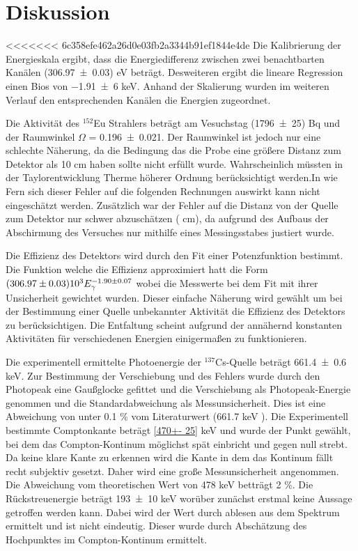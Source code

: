 \section{Diskussion}
\label{sec:Diskussion}
<<<<<<< 6c358efe462a26d0e03fb2a3344b91ef1844e4de
Die Kalibrierung der Energieskala ergibt, dass die Energiedifferenz zwischen zwei benachtbarten Kanälen (\num{306.97 +- 0.03}) eV beträgt. Desweiteren ergibt die lineare Regression einen Bios von \num{-1.91 +- 6} keV. Anhand der Skalierung wurden im weiteren Verlauf den entsprechenden Kanälen die Energien zugeordnet. 

Die Aktivität des $^{152}$Eu Strahlers beträgt am Vesuchstag (\num{1796 +- 25}) Bq und der Raumwinkel $\Omega$ = \num{0.196 +- 0.021}. Der Raumwinkel ist jedoch nur eine schlechte Näherung, da die Bedingung das die Probe eine größere Distanz zum Detektor als 10 cm haben sollte nicht erfüllt wurde. Wahrscheinlich müssten in der Taylorentwicklung Therme höherer Ordnung berücksichtigt werden.In wie Fern sich dieser Fehler auf die folgenden Rechnungen auswirkt kann nicht eingeschätzt werden. Zusätzlich war der Fehler auf die Distanz von der Quelle zum Detektor nur schwer abzuschätzen ( cm), da aufgrund des Aufbaus der Abschirmung des Versuches nur mithilfe eines Messingsstabes justiert wurde. 

Die Effizienz des Detektors wird durch den Fit einer Potenzfunktion bestimmt. Die Funktion welche die Effizienz approximiert hatt die Form $(\num{306.97 +- 0.03})10^3 E_\gamma^{\num{-1.90 +- 0.07}}$ wobei die Messwerte bei dem Fit mit ihrer Unsicherheit gewichtet wurden. Dieser einfache Näherung wird gewählt um bei der Bestimmung einer Quelle unbekannter Aktivität die Effizienz des Detektors zu berücksichtigen. Die Entfaltung scheint aufgrund der annähernd konstanten Aktivitäten für verschiedenen Energien einigermaßen zu funktionieren.  

Die experimentell ermittelte Photoenergie der $^{137}$Cs-Quelle beträgt \num{661.4 +- 0.6} keV. Zur Bestimmung der Verschiebung und des Fehlers wurde durch den Photopeak eine Gaußglocke gefittet und die Verschiebung als Photopeak-Energie genommen und die Standardabweichung als Messunsicherheit. Dies ist eine Abweichung von unter 0.1 \% vom Literaturwert (661.7 keV \cite{Cs}). Die Experimentell bestimmte Comptonkante beträgt \ref{470+- 25} keV und wurde der Punkt gewählt, bei dem das Compton-Kontinum möglichst spät einbricht und gegen null strebt. Da keine klare Kante zu erkennen wird die Kante in dem das Kontinum fällt recht subjektiv gesetzt. Daher wird eine große Messunsicherheit angenommen. Die Abweichung vom theoretischen Wert von 478 keV betträgt 2 \%. Die Rückstreuenergie beträgt \num{193+- 10} keV worüber zunächst erstmal keine Aussage getroffen werden kann. Dabei wird der Wert durch ablesen aus dem Spektrum ermittelt und ist nicht eindeutig. Dieser wurde durch Abschätzung des Hochpunktes im Compton-Kontinum ermittelt. 

